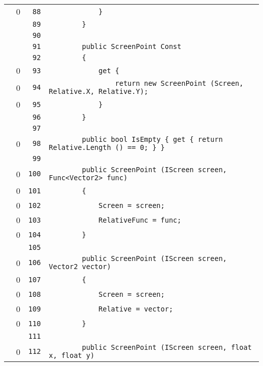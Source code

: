 \documentclass[a4paper,10pt]{article}
\begin{document}
\begin{longtable}[l]{lrrl}
\cellcolor{red} & 0 & \verb~88~ & \verb~            }~\\
\cellcolor{gray} &  & \verb~89~ & \verb~        }~\\
\cellcolor{gray} &  & \verb~90~ & \verb~~\\
\cellcolor{gray} &  & \verb~91~ & \verb~        public ScreenPoint Const~\\
\cellcolor{gray} &  & \verb~92~ & \verb~        {~\\
\cellcolor{red} & 0 & \verb~93~ & \verb~            get {~\\
\cellcolor{red} & 0 & \verb~94~ & \verb~                return new ScreenPoint (Screen, Relative.X, Relative.Y);~\\
\cellcolor{red} & 0 & \verb~95~ & \verb~            }~\\
\cellcolor{gray} &  & \verb~96~ & \verb~        }~\\
\cellcolor{gray} &  & \verb~97~ & \verb~~\\
\cellcolor{red} & 0 & \verb~98~ & \verb~        public bool IsEmpty { get { return Relative.Length () == 0; } }~\\
\cellcolor{gray} &  & \verb~99~ & \verb~~\\
\cellcolor{red} & 0 & \verb~100~ & \verb~        public ScreenPoint (IScreen screen, Func<Vector2> func)~\\
\cellcolor{red} & 0 & \verb~101~ & \verb~        {~\\
\cellcolor{red} & 0 & \verb~102~ & \verb~            Screen = screen;~\\
\cellcolor{red} & 0 & \verb~103~ & \verb~            RelativeFunc = func;~\\
\cellcolor{red} & 0 & \verb~104~ & \verb~        }~\\
\cellcolor{gray} &  & \verb~105~ & \verb~~\\
\cellcolor{red} & 0 & \verb~106~ & \verb~        public ScreenPoint (IScreen screen, Vector2 vector)~\\
\cellcolor{red} & 0 & \verb~107~ & \verb~        {~\\
\cellcolor{red} & 0 & \verb~108~ & \verb~            Screen = screen;~\\
\cellcolor{red} & 0 & \verb~109~ & \verb~            Relative = vector;~\\
\cellcolor{red} & 0 & \verb~110~ & \verb~        }~\\
\cellcolor{gray} &  & \verb~111~ & \verb~~\\
\cellcolor{red} & 0 & \verb~112~ & \verb~        public ScreenPoint (IScreen screen, float x, float y)~\\

\end{longtable}
\end{document}
